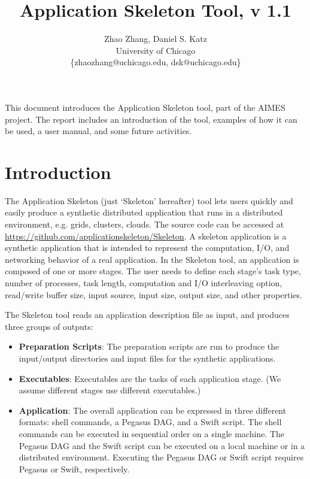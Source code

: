\documentclass[10pt,a4paper]{article}
\title{Application Skeleton Tool, v 1.1}
\author{Zhao Zhang, Daniel S. Katz \\
University of Chicago \\
\{zhaozhang@uchicago.edu, dsk@uchicago.edu\}}
\begin{document}
\maketitle


This document introduces the Application Skeleton tool, part of the AIMES project. The report includes an introduction of the tool, examples of how it can be used, a user manual, and some future activities.

\newpage

\tableofcontents

\newpage

\section{Introduction}

The Application Skeleton (just `Skeleton' hereafter) tool \cite{Skeleton2013, Skeleton2014} lets users quickly and easily produce a synthetic distributed application that runs in a distributed environment, e.g. grids, clusters, clouds. The source code can be accessed at \url{https://github.com/applicationskeleton/Skeleton}.
A skeleton application is a synthetic application that is intended to represent the computation, I/O, and networking behavior of a real application.
In the Skeleton tool, an application is composed of one or more stages.
The user needs to define each stage's task type, number of processes, task length, computation and I/O interleaving option, read/write buffer size, input source, input size, output size, and other properties.

The Skeleton tool reads an application description file as input, and produces three groups of outputs: 
\begin{itemize}

\item[] \textbf{Preparation Scripts}: The preparation scripts are run to produce the input/output directories and input files for the synthetic applications.

\item[] \textbf{Executables}: Executables are the tasks of each application stage. (We assume different stages use different executables.)

\item[] \textbf{Application}: The overall application can be expressed in three different formats: shell commands, a Pegasus DAG, and a Swift script.
The shell commands can be executed in sequential order on a single machine.
The Pegasus DAG and the Swift script can be executed on a local machine or in a distributed environment.
Executing the Pegasus DAG or Swift script requires Pegasus or Swift, respectively.

\end{itemize}
\end{document}
